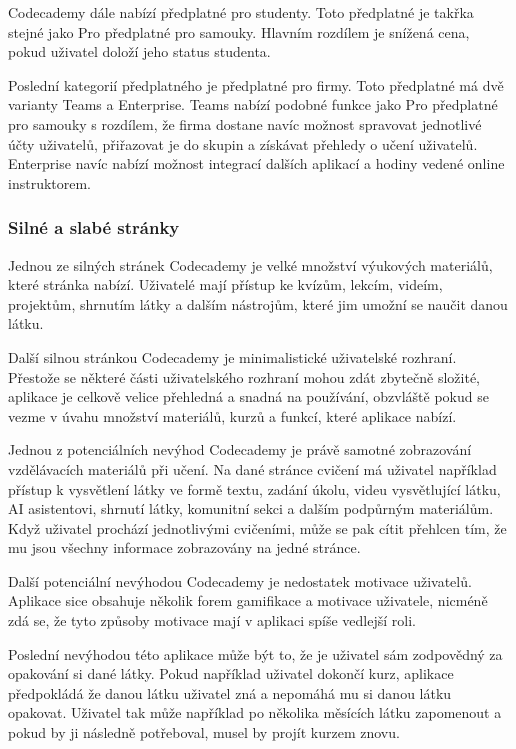 Codecademy dále nabízí předplatné pro studenty. Toto předplatné je takřka stejné jako Pro předplatné pro samouky. Hlavním rozdílem je snížená cena, pokud uživatel doloží jeho status studenta.  

Poslední kategorií předplatného je předplatné pro firmy. Toto předplatné má dvě varianty Teams a Enterprise. Teams nabízí podobné funkce jako Pro předplatné pro samouky s rozdílem, že firma dostane navíc možnost spravovat jednotlivé účty uživatelů, přiřazovat je do skupin a získávat přehledy o učení uživatelů. Enterprise navíc nabízí možnost integrací dalších aplikací a hodiny vedené online instruktorem.


\subsubsection{Silné a slabé stránky}

Jednou ze silných stránek Codecademy je velké množství výukových materiálů, které stránka nabízí. Uživatelé mají přístup ke kvízům, lekcím, videím, projektům, shrnutím látky a dalším nástrojům, které jim umožní se naučit danou látku.

Další silnou stránkou Codecademy je minimalistické uživatelské rozhraní. Přestože se některé části uživatelského rozhraní mohou zdát zbytečně složité, aplikace je celkově velice přehledná a snadná na používání, obzvláště pokud se vezme v úvahu množství materiálů, kurzů a funkcí, které aplikace nabízí.

Jednou z potenciálních nevýhod Codecademy je právě samotné zobrazování vzdělávacích materiálů při učení. Na dané stránce cvičení má uživatel například přístup k vysvětlení látky ve formě textu, zadání úkolu, videu vysvětlující látku, AI asistentovi, shrnutí látky, komunitní sekci a dalším podpůrným materiálům. Když uživatel prochází jednotlivými cvičeními, může se pak cítit přehlcen tím, že mu jsou všechny informace zobrazovány na jedné stránce.

Další potenciální nevýhodou Codecademy je nedostatek motivace uživatelů. Aplikace sice obsahuje několik forem gamifikace a motivace uživatele, nicméně zdá se, že tyto způsoby motivace mají v aplikaci spíše vedlejší roli.

Poslední nevýhodou této aplikace může být to, že je uživatel sám zodpovědný za opakování si dané látky. Pokud například uživatel dokončí kurz, aplikace předpokládá že danou látku uživatel zná a nepomáhá mu si danou látku opakovat. Uživatel tak může například po několika měsících látku zapomenout a pokud by ji následně potřeboval, musel by projít kurzem znovu.

